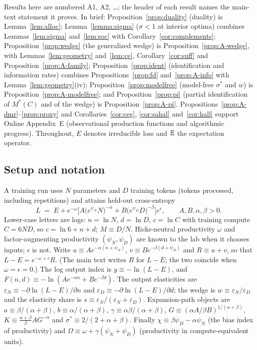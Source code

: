 Results here are numbered A1, A2, \dots; the header of each result names the main-text statement it proves. In
brief: Proposition~\ref{prop:duality} (duality) is Lemma~\ref{lem:alloc}; Lemma~\ref{lemma:sigma} ($\sigma<1$ at interior
optima) combines Lemmas~\ref{lem:sigma} and~\ref{lem:soc} with Corollary~\ref{cor:complements};
Proposition~\ref{prop:wedge} (the generalized wedge) is Proposition~\ref{prop:A-wedge}, with Lemmas~\ref{lem:geometry}
and~\ref{lem:ce}, Corollary~\ref{cor:suff} and Proposition~\ref{prop:A-family}; Proposition~\ref{prop:ident}
(identification and information rates) combines Propositions~\ref{prop:fd} and~\ref{prop:A-info} with
Lemma~\ref{lem:geometry}(iv); Proposition~\ref{prop:modelfree} (model-free $\sigma^*$ and $w$) is
Proposition~\ref{prop:A-modelfree}; and Proposition~\ref{prop:pi} (partial identification of $M^*(C)$ and of the wedge) is
Proposition~\ref{prop:A-pi}. Propositions~\ref{prop:A-dmr}--\ref{prop:proxy} and Corollaries~\ref{cor:ceg},
\ref{cor:sahal} and~\ref{cor:hall} support Online Appendix~E (observational production functions and algorithmic
progress). Throughout, $E$ denotes irreducible loss and $\mathbb{E}$ the expectation operator.

\subsection{Setup and notation}\label{app:setup}

\begin{definition}[Technology]\label{def:tech}
A training run uses $N$ parameters and $D$ training tokens (tokens processed, including repetitions) and attains
held-out cross-entropy
\begin{equation}\label{eq:A-tech}
L \;=\; E + e^{-\omega}\Big[A\big(e^{\psi_N}N\big)^{-\alpha} + B\big(e^{\psi_D}D\big)^{-\beta}\Big]e^{\epsilon},
\qquad A,B,\alpha,\beta>0 .
\end{equation}
Lower-case letters are logs: $n=\ln N$, $d=\ln D$, $c=\ln C$ with training compute $C=6ND$, so $c=\ln 6+n+d$; $M\equiv D/N$.
Hicks-neutral productivity $\omega$ and factor-augmenting productivity $(\psi_N,\psi_D)$ are known to the lab when it
chooses inputs; $\epsilon$ is not. Write $u\equiv Ae^{-\alpha(n+\psi_N)}$, $v\equiv Be^{-\beta(d+\psi_D)}$ and
$R\equiv u+v$, so that $L-E=e^{-\omega+\epsilon}R$. (The main text writes $R$ for $L-E$; the two coincide when $\omega=\epsilon=0$.) The log output index is $y\equiv-\ln(L-E)$, and
$F(n,d)\equiv-\ln(Ae^{-\alpha n}+Be^{-\beta d})$. The output elasticities are
$\varepsilon_N\equiv-\partial\ln(L-E)/\partial n$ and $\varepsilon_D\equiv-\partial\ln(L-E)/\partial d$; the wedge is
$w\equiv\varepsilon_N/\varepsilon_D$ and the elasticity share is $s\equiv\varepsilon_N/(\varepsilon_N+\varepsilon_D)$.
Expansion-path objects are $a\equiv\beta/(\alpha+\beta)$, $b\equiv\alpha/(\alpha+\beta)$,
$\gamma\equiv\alpha\beta/(\alpha+\beta)$, $G\equiv(\alpha A/\beta B)^{1/(\alpha+\beta)}$,
$K\equiv\frac{\alpha+\beta}{\beta}AG^{-\alpha}$ and $\sigma^*\equiv2/(2+\alpha+\beta)$. Finally
$\chi\equiv\beta\psi_D-\alpha\psi_N$ (the bias index of productivity) and
$\Omega\equiv\omega+\gamma(\psi_N+\psi_D)$ (productivity in compute-equivalent units).
\end{definition}

